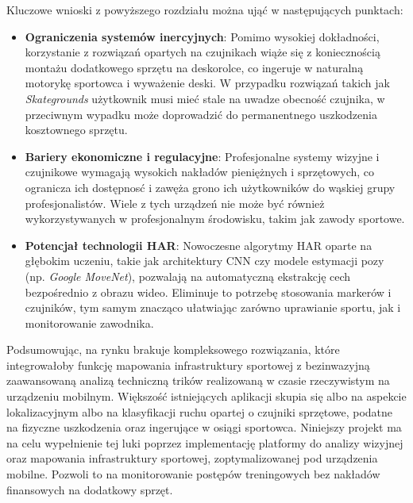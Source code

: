         Kluczowe wnioski z powyższego rozdziału można ująć w następujących punktach:
        \begin{itemize}
            \item \textbf{Ograniczenia systemów inercyjnych}: Pomimo wysokiej dokładności, korzystanie z rozwiązań opartych na czujnikach wiąże się z koniecznością montażu dodatkowego sprzętu na deskorolce, co ingeruje w naturalną motorykę sportowca i wyważenie deski. W przypadku rozwiązań takich jak \textit{Skategrounds} użytkownik musi mieć stale na uwadze obecność czujnika, w przeciwnym wypadku może doprowadzić do permanentnego uszkodzenia kosztownego sprzętu.
            \item \textbf{Bariery ekonomiczne i regulacyjne}: Profesjonalne systemy wizyjne i czujnikowe wymagają wysokich nakładów pieniężnych i sprzętowych, co ogranicza ich dostępnosć i zawęża grono ich użytkowników do wąskiej grupy profesjonalistów. Wiele z tych urządzeń nie może być również wykorzystywanych w profesjonalnym środowisku, takim jak zawody sportowe.
            \item \textbf{Potencjał technologii HAR}: Nowoczesne algorytmy HAR oparte na głębokim uczeniu, takie jak architektury CNN czy modele estymacji pozy (np. \textit{Google MoveNet}), pozwalają na automatyczną ekstrakcję cech bezpośrednio z obrazu wideo. Eliminuje to potrzebę stosowania markerów i czujników, tym samym znacząco ułatwiając zarówno uprawianie sportu, jak i monitorowanie zawodnika.
        \end{itemize}

        Podsumowując, na rynku brakuje kompleksowego rozwiązania, które integrowałoby funkcję mapowania infrastruktury sportowej z bezinwazyjną zaawansowaną analizą techniczną trików realizowaną w czasie rzeczywistym na urządzeniu mobilnym. Większość istniejących aplikacji skupia się albo na aspekcie lokalizacyjnym albo na klasyfikacji ruchu opartej o czujniki sprzętowe, podatne na fizyczne uszkodzenia oraz ingerujące w osiągi sportowca. Niniejszy projekt ma na celu wypełnienie tej luki poprzez implementację platformy do analizy wizyjnej oraz mapowania infrastruktury sportowej, zoptymalizowanej pod urządzenia mobilne. Pozwoli to na monitorowanie postępów treningowych bez nakładów finansowych na dodatkowy sprzęt.
        